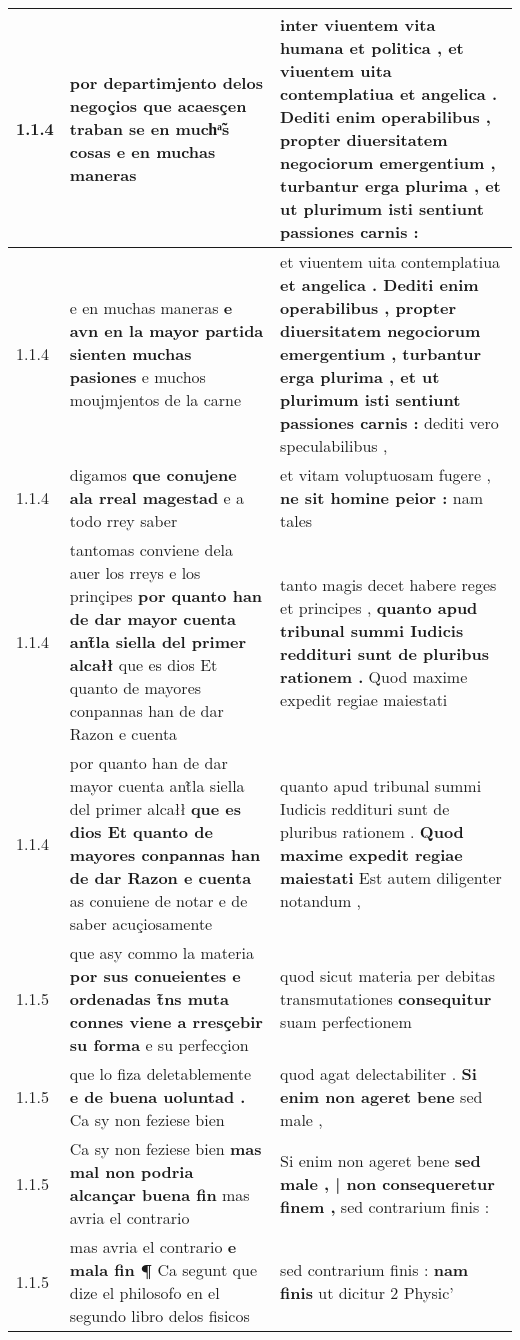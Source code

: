 \begin{tabular}{|p{1cm}|p{6.5cm}|p{6.5cm}|}
1.1.4 & por departimjento delos negoçios \textbf{ que acaesçen traban se en muchͣ̃s cosas } e en muchas maneras & inter viuentem vita humana et politica , \textbf{ et viuentem uita contemplatiua } et angelica . Dediti enim operabilibus , propter diuersitatem negociorum emergentium , turbantur erga plurima , et ut plurimum isti sentiunt passiones carnis : \\\hline
1.1.4 & e en muchas maneras \textbf{ e avn en la mayor partida sienten muchas pasiones } e muchos moujmjentos de la carne & et viuentem uita contemplatiua \textbf{ et angelica . Dediti enim operabilibus , propter diuersitatem negociorum emergentium , turbantur erga plurima , et ut plurimum isti sentiunt passiones carnis : } dediti vero speculabilibus , \\\hline
1.1.4 & digamos \textbf{ que conujene ala rreal magestad } e a todo rrey saber & et vitam voluptuosam fugere , \textbf{ ne sit homine peior : } nam tales \\\hline
1.1.4 & tantomas conviene dela auer los rreys e los prinçipes \textbf{ por quanto han de dar mayor cuenta ant̃la siella del primer alcałł } que es dios Et quanto de mayores conpannas han de dar Razon e cuenta & tanto magis decet habere reges et principes , \textbf{ quanto apud tribunal summi Iudicis reddituri sunt de pluribus rationem . } Quod maxime expedit regiae maiestati \\\hline
1.1.4 & por quanto han de dar mayor cuenta ant̃la siella del primer alcałł \textbf{ que es dios Et quanto de mayores conpannas han de dar Razon e cuenta } as conuiene de notar e de saber acuçiosamente & quanto apud tribunal summi Iudicis reddituri sunt de pluribus rationem . \textbf{ Quod maxime expedit regiae maiestati } Est autem diligenter notandum , \\\hline
1.1.5 & que asy commo la materia \textbf{ por sus conueientes e ordenadas t̃ns muta connes viene a rresçebir su forma } e su perfecçion & quod sicut materia per debitas transmutationes \textbf{ consequitur } suam perfectionem \\\hline
1.1.5 & que lo fiza deletablemente \textbf{ e de buena uoluntad . } Ca sy non feziese bien & quod agat delectabiliter . \textbf{ Si enim non ageret bene } sed male , \\\hline
1.1.5 & Ca sy non feziese bien \textbf{ mas mal non podria alcançar buena fin } mas avria el contrario & Si enim non ageret bene \textbf{ sed male , | non consequeretur finem , } sed contrarium finis : \\\hline
1.1.5 & mas avria el contrario \textbf{ e mala fin ¶ } Ca segunt que dize el philosofo en el segundo libro delos fisicos & sed contrarium finis : \textbf{ nam finis } ut dicitur 2 Physic’ \\\hline

\end{tabular}
